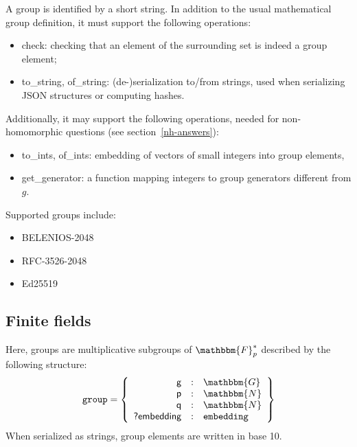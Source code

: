 \documentclass[a4paper]{article}
\newcommand{\F}{\mathbbm{F}}
\newcommand{\G}{\mathbbm{G}}
\newcommand{\N}{\mathbbm{N}}
\begin{document}
A group is identified by a short string. In addition to the usual
mathematical group definition, it must support the following
operations:
\begin{itemize}
\item \textsf{check}: checking that an element of the surrounding set
  is indeed a group element;
\item \textsf{to\_string}, \textsf{of\_string}: (de-)serialization
  to/from strings, used when serializing JSON structures or computing
  hashes.
\end{itemize}
Additionally, it may support the following operations, needed for
non-homomorphic questions (see section~\ref{nh-answers}):
\begin{itemize}
\item \textsf{to\_ints}, \textsf{of\_ints}: embedding of vectors of
  small integers into group elements,
\item \textsf{get\_generator}: a function mapping integers to group
  generators different from $g$.
\end{itemize}
Supported groups include:
\begin{itemize}
\item BELENIOS-2048
\item RFC-3526-2048
\item Ed25519
\end{itemize}

\subsection{Finite fields}

Here, groups are multiplicative subgroups of $\F^*_p$ described by the
following structure:
\begin{gather*}
  \texttt{group}=\left\{
    \begin{array}{rcl}
      \textsf{g}&:&\G\\
      \textsf{p}&:&\N\\
      \textsf{q}&:&\N\\
      \textsf{?embedding}&:&\texttt{embedding}
    \end{array}
  \right\}
\end{gather*}
When serialized as strings, group elements are written in base 10.
\end{document}
